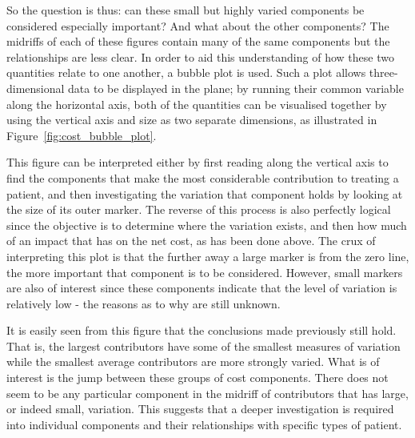 So the question is thus: can these small but highly varied components be
considered especially important? And what about the other components? The
midriffs of each of these figures contain many of the same components but the
relationships are less clear. In order to aid this understanding of how these
two quantities relate to one another, a bubble plot is used. Such a plot allows
three-dimensional data to be displayed in the plane; by running their common
variable along the horizontal axis, both of the quantities can be visualised
together by using the vertical axis and size as two separate dimensions, as
illustrated in Figure~\ref{fig:cost_bubble_plot}.

This figure can be interpreted either by first reading along the vertical axis
to find the components that make the most considerable contribution to treating
a patient, and then investigating the variation that component holds by looking
at the size of its outer marker. The reverse of this process is also perfectly
logical since the objective is to determine where the variation exists, and then
how much of an impact that has on the net cost, as has been done above. The crux
of interpreting this plot is that the further away a large marker is from the
zero line, the more important that component is to be considered. However, small
markers are also of interest since these components indicate that the level of
variation is relatively low \-- the reasons as to why are still unknown.

It is easily seen from this figure that the conclusions made previously still
hold. That is, the largest contributors have some of the smallest measures of
variation while the smallest average contributors are more strongly varied. What
is of interest is the jump between these groups of cost components. There does
not seem to be any particular component in the midriff of contributors that has
large, or indeed small, variation. This suggests that a deeper investigation is
required into individual components and their relationships with specific types
of patient.
